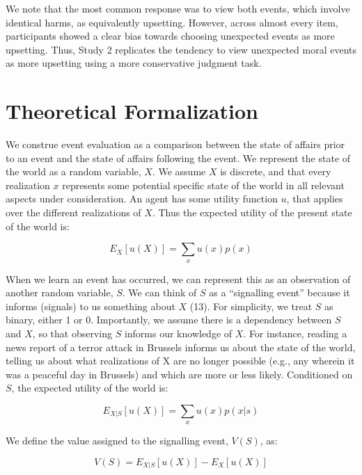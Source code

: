 \documentclass[9pt,twocolumn,twoside,]{pnas-new}
\begin{document}
{We note that the most common response was to view both events, which
involve identical harms, as equivalently upsetting. However, across
almost every item, participants showed a clear bias towards choosing
unexpected events as more upsetting. Thus, Study 2 replicates the
tendency to view unexpected moral events as more upsetting using a more
conservative judgment task.

\section*{Theoretical Formalization}\label{theory}

We construe event evaluation as a comparison between the state of
affairs prior to an event and the state of affairs following the event.
We represent the state of the world as a random variable, \(X\). We
assume \(X\) is discrete, and that every realization \(x\) represents
some potential specific state of the world in all relevant aspects under
consideration. An agent has some utility function \(u\), that applies
over the different realizations of \(X\). Thus the expected utility of
the present state of the world is:

\begin{equation*}
E_X[u(X)] = \sum_x u(x)p(x)
\end{equation*}

When we learn an event has occurred, we can represent this as an
observation of another random variable, \(S\). We can think of \(S\) as
a ``signalling event'' because it informs (signals) to us something
about \(X\) (13). For simplicity, we treat \(S\) as binary, either 1 or
0. Importantly, we assume there is a dependency between \(S\) and \(X\),
so that observing \(S\) informs our knowledge of \(X\). For instance,
reading a news report of a terror attack in Brussels informs us about
the state of the world, telling us about what realizations of X are no
longer possible (e.g., any wherein it was a peaceful day in Brussels)
and which are more or less likely. Conditioned on \(S\), the expected
utility of the world is:

\begin{equation*}
E_{X|S}[u(X)] = \sum_x u(x)p(x|s)
\end{equation*}

We define the value assigned to the signalling event, \(V(S)\), as:

\begin{equation}
V(S) = E_{X|S}[u(X)] - E_X[u(X)]
\end{equation}

}
\end{document}

